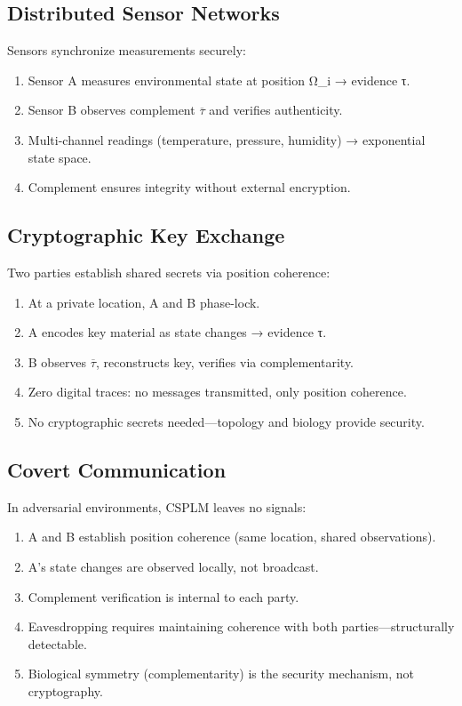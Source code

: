 \documentclass[11pt,a4paper]{article}
\theoremstyle{definition}
\newcommand{\comp}[1]{\overline{#1}}
\begin{document}
\subsection{Distributed Sensor Networks}

Sensors synchronize measurements securely:
\begin{enumerate}
\item Sensor A measures environmental state at position Ω_i → evidence τ.
\item Sensor B observes complement $\comp{\tau}$ and verifies authenticity.
\item Multi-channel readings (temperature, pressure, humidity) → exponential state space.
\item Complement ensures integrity without external encryption.
\end{enumerate}

\subsection{Cryptographic Key Exchange}

Two parties establish shared secrets via position coherence:
\begin{enumerate}
\item At a private location, A and B phase-lock.
\item A encodes key material as state changes → evidence τ.
\item B observes $\comp{\tau}$, reconstructs key, verifies via complementarity.
\item Zero digital traces: no messages transmitted, only position coherence.
\item No cryptographic secrets needed—topology and biology provide security.
\end{enumerate}

\subsection{Covert Communication}

In adversarial environments, CSPLM leaves no signals:
\begin{enumerate}
\item A and B establish position coherence (same location, shared observations).
\item A's state changes are observed locally, not broadcast.
\item Complement verification is internal to each party.
\item Eavesdropping requires maintaining coherence with both parties—structurally detectable.
\item Biological symmetry (complementarity) is the security mechanism, not cryptography.
\end{enumerate}
\end{document}
